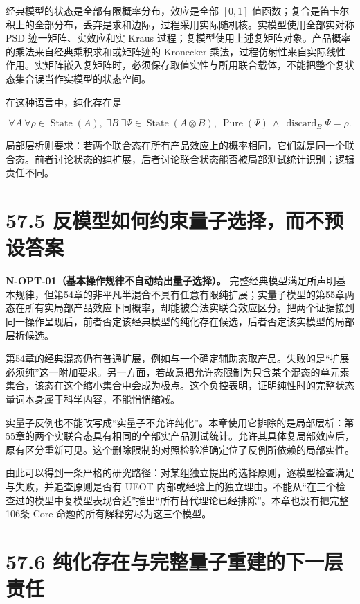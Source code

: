 \documentclass[
  11pt,
  oneside]{book}
\begin{document}
经典模型的状态是全部有限概率分布，效应是全部 \([0,1]\)
值函数；复合是笛卡尔积上的全部分布，丢弃是求和边际，过程采用实际随机核。实模型使用全部实对称
PSD 迹一矩阵、实效应和实 Kraus
过程；复模型使用上述复矩阵对象。产品概率的乘法来自经典乘积求和或矩阵迹的
Kronecker
乘法，过程仿射性来自实际线性作用。实矩阵嵌入复矩阵时，必须保存取值实性与所用联合载体，不能把整个复状态集合误当作实模型的状态空间。

在这种语言中，纯化存在是

\[
\forall A\ \forall\rho\in\operatorname{State}(A),\
\exists B\ \exists\Psi\in\operatorname{State}(A\otimes B),\
\operatorname{Pure}(\Psi)\ \land\ \operatorname{discard}_{B}\Psi=\rho.
\]

局部层析则要求：若两个联合态在所有产品效应上的概率相同，它们就是同一个联合态。前者讨论状态的纯扩展，后者讨论联合状态能否被局部测试统计识别；逻辑责任不同。

\section{57.5 反模型如何约束量子选择，而不预设答案}

\protect\hypertarget{n-opt-01}{}{}

\textbf{N-OPT-01（基本操作规律不自动给出量子选择）。}
完整经典模型满足所声明基本规律，但第54章的非平凡半混合不具有任意有限纯扩展；实量子模型的第55章两态在所有实局部产品效应下同概率，却能被合法实联合效应区分。把两个证据接到同一操作呈现后，前者否定该经典模型的纯化存在候选，后者否定该实模型的局部层析候选。

第54章的经典混态仍有普通扩展，例如与一个确定辅助态取产品。失败的是``扩展必须纯''这一附加要求。另一方面，若故意把允许态限制为只含某个混态的单元素集合，该态在这个缩小集合中会成为极点。这个负控表明，证明纯性时的完整状态量词本身属于科学内容，不能悄悄缩减。

实量子反例也不能改写成``实量子不允许纯化''。本章使用它排除的是局部层析：第55章的两个实联合态具有相同的全部实产品测试统计。允许其具体复局部效应后，原有区分重新可见。这个删除限制的对照检验准确定位了反例所依赖的局部实性。

由此可以得到一条严格的研究路径：对某组独立提出的选择原则，逐模型检查满足与失败，并追查原则是否有
UEOT
内部或经验上的独立理由。不能从``在三个检查过的模型中复模型表现合适''推出``所有替代理论已经排除''。本章也没有把完整106条
Core 命题的所有解释穷尽为这三个模型。

\section{57.6 纯化存在与完整量子重建的下一层责任}
\end{document}
